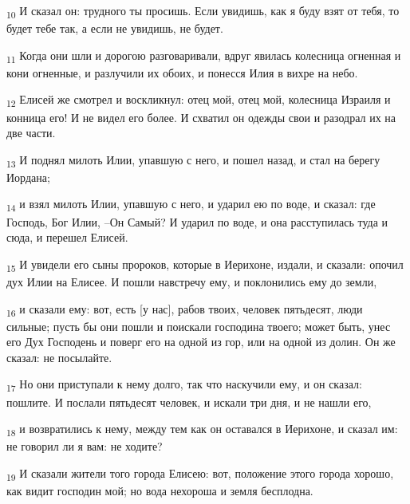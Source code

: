 \begin{tcolorbox}
\textsubscript{10} И сказал он: трудного ты просишь. Если увидишь, как я буду взят от тебя, то будет тебе так, а если не увидишь, не будет.
\end{tcolorbox}
\begin{tcolorbox}
\textsubscript{11} Когда они шли и дорогою разговаривали, вдруг явилась колесница огненная и кони огненные, и разлучили их обоих, и понесся Илия в вихре на небо.
\end{tcolorbox}
\begin{tcolorbox}
\textsubscript{12} Елисей же смотрел и воскликнул: отец мой, отец мой, колесница Израиля и конница его! И не видел его более. И схватил он одежды свои и разодрал их на две части.
\end{tcolorbox}
\begin{tcolorbox}
\textsubscript{13} И поднял милоть Илии, упавшую с него, и пошел назад, и стал на берегу Иордана;
\end{tcolorbox}
\begin{tcolorbox}
\textsubscript{14} и взял милоть Илии, упавшую с него, и ударил ею по воде, и сказал: где Господь, Бог Илии, --Он Самый? И ударил по воде, и она расступилась туда и сюда, и перешел Елисей.
\end{tcolorbox}
\begin{tcolorbox}
\textsubscript{15} И увидели его сыны пророков, которые в Иерихоне, издали, и сказали: опочил дух Илии на Елисее. И пошли навстречу ему, и поклонились ему до земли,
\end{tcolorbox}
\begin{tcolorbox}
\textsubscript{16} и сказали ему: вот, есть [у нас], рабов твоих, человек пятьдесят, люди сильные; пусть бы они пошли и поискали господина твоего; может быть, унес его Дух Господень и поверг его на одной из гор, или на одной из долин. Он же сказал: не посылайте.
\end{tcolorbox}
\begin{tcolorbox}
\textsubscript{17} Но они приступали к нему долго, так что наскучили ему, и он сказал: пошлите. И послали пятьдесят человек, и искали три дня, и не нашли его,
\end{tcolorbox}
\begin{tcolorbox}
\textsubscript{18} и возвратились к нему, между тем как он оставался в Иерихоне, и сказал им: не говорил ли я вам: не ходите?
\end{tcolorbox}
\begin{tcolorbox}
\textsubscript{19} И сказали жители того города Елисею: вот, положение этого города хорошо, как видит господин мой; но вода нехороша и земля бесплодна.
\end{tcolorbox}
